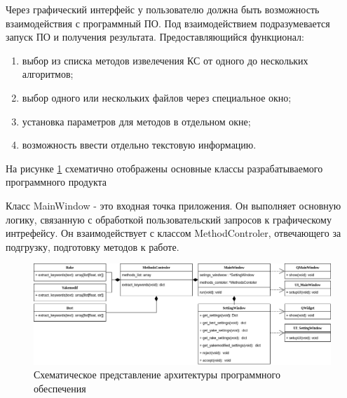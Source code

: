 Через графический интерфейс у пользователю должна быть возможность взаимодействия с программный ПО. 
Под взаимодействием подразумевается запуск ПО и получения результата.
Предоставляющийся функционал:
\begin{enumerate}
	\item выбор из списка методов извелечения КС от одного до нескольких алгоритмов;
	\item выбор одного или нескольких файлов через специальное окно;
	\item установка параметров для методов в отдельном окне;
	\item возможность ввести отдельно текстовую информацию.
\end{enumerate}

На рисунке \ref{fig:classdiagram} схематично отображены основные классы разрабатываемого программного продукта

Класс MainWindow - это входная точка приложения.
Он выполняет основную логику, связанную с обработкой пользовательский запросов к графическому интрефейсу.
Он взаимодействует с классом MethodControler, отвечающего за подгрузку, подготовку методов к работе.

\begin{figure}[!h]
	\centering
	\includegraphics[width=1\linewidth]{src/img/class_diagram}
	\caption{Схематическое представление архитектуры программного обеспечения}
	\label{fig:classdiagram}
\end{figure}

